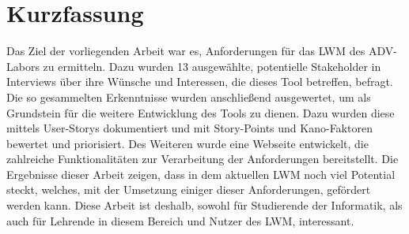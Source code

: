 \chapter*{Kurzfassung}

Das Ziel der vorliegenden Arbeit war es, Anforderungen für das \ac{LWM} des ADV-Labors zu ermitteln. Dazu wurden 13 ausgewählte, potentielle Stakeholder in Interviews über ihre Wünsche und Interessen, die dieses Tool betreffen, befragt. Die so gesammelten Erkenntnisse wurden anschließend ausgewertet, um als Grundstein für die weitere Entwicklung des Tools zu dienen. Dazu wurden diese mittels User-Storys dokumentiert und mit Story-Points und Kano-Faktoren bewertet und priorisiert. Des Weiteren wurde eine Webseite entwickelt, die zahlreiche Funktionalitäten zur Verarbeitung der Anforderungen bereitstellt. Die Ergebnisse dieser Arbeit zeigen, dass in dem aktuellen LWM noch viel Potential steckt, welches, mit der Umsetzung einiger dieser Anforderungen, gefördert werden kann. Diese Arbeit ist deshalb, sowohl für Studierende der Informatik, als auch für Lehrende in diesem Bereich und Nutzer des LWM, interessant.

